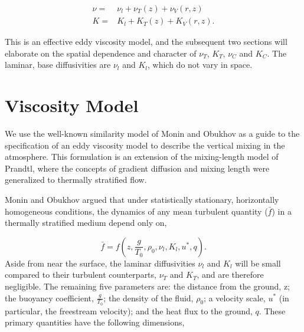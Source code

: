 \begin{eqnarray*}
 \nu =& \nu_{l} + \nu_{T}(z) + \nu_{V}(r,z) \\
 K =& K_{l} + K_{T}(z) + K_{V}(r,z).
\end{eqnarray*}

This is an effective eddy viscosity model\cite{boussinesq1887}, and the
subsequent two sections will elaborate on the spatial dependence and
character of $\nu_T$, $K_T$, $\nu_C$ and $K_C$. The laminar, base
diffusivities are $\nu_l$ and $K_l$, which do not vary in space.  

\section{Viscosity Model}

We use the well-known similarity model of Monin and
Obukhov\cite{monin2007statistical,1990JFM...212..637K} as
a guide to the specification of an eddy viscosity model to describe the
vertical mixing in the atmosphere. This formulation is an extension of
the mixing-length model of Prandtl, where the concepts of gradient
diffusion and mixing length were generalized to thermally stratified
flow.    

%
%

Monin and Obukhov argued that under statistically stationary, horizontally
homogeneous conditions, the dynamics of any mean turbulent quantity
($\bar f$) in a thermally stratified medium depend only on,  

\begin{equation}
\bar f = f(z,\frac{g}{T_0},\rho_0,\nu_l,K_l,u^*,q).
\end{equation}
Aside from near the surface, the laminar diffusivities $\nu_l$ 
and $K_l$ will be  
small compared to their turbulent counterparts, $\nu_T$ and $K_T$, and 
are therefore negligible. 
The remaining five parameters are: the distance from the ground, z; the
buoyancy coefficient, $\frac{g}{T_0}$; the density of the fluid,
$\rho_0$; a velocity scale, $u^*$ (in particular, the freestream
velocity); and the heat flux to the ground, $q$. %
%
% 
These primary quantities have the following dimensions,

